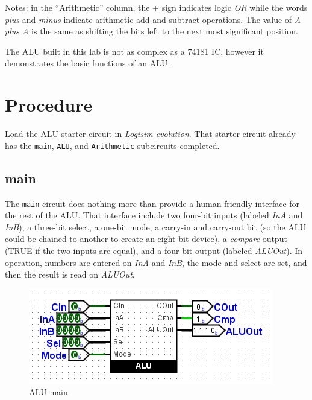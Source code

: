 Notes: in the ``Arithmetic'' column, the + sign indicates logic \textit{OR} while the words \textit{plus} and \textit{minus} indicate arithmetic add and subtract operations. The value of \textit{A plus A} is the same as shifting the bits left to the next most significant position.

The \ac{ALU} built in this lab is not as complex as a 74181 \ac{IC}, however it demonstrates the basic functions of an \ac{ALU}.

\section{Procedure}

Load the \ac{ALU} starter circuit in \textit{Logisim-evolution}. That starter circuit already has the \lstinline[columns=fixed]|main|, \lstinline[columns=fixed]|ALU|, and \lstinline[columns=fixed]|Arithmetic| subcircuits completed.

\subsection{main}

The \lstinline[columns=fixed]|main| circuit does nothing more than provide a human-friendly interface for the rest of the \ac{ALU}. That interface include two four-bit inputs (labeled \textit{InA} and \textit{InB}), a three-bit select, a one-bit mode, a carry-in and carry-out bit (so the \ac{ALU} could be chained to another to create an eight-bit device), a \textit{compare} output (TRUE if the two inputs are equal), and a four-bit output (labeled \textit{ALUOut}). In operation, numbers are entered on \textit{InA} and \textit{InB}, the mode and select are set, and then the result is read on \textit{ALUOut}.

\begin{figure}[H]
	\centering
	\includegraphics[width=\maxwidth{.95\linewidth}]{gfx/alu-01}
	\caption{ALU main}
	\label{fig:alu-01}
\end{figure}

